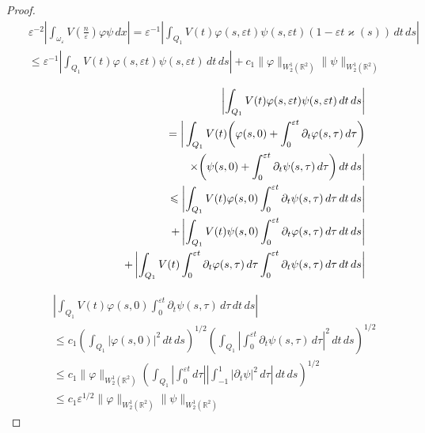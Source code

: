 \documentclass[graybox]{svmult}
\renewcommand{\kappa}{\varkappa}
\newcommand{\Real}{\mathbb R}
\newcommand{\eps}{\varepsilon}
\renewcommand{\phi}{\varphi}
\renewcommand{\leq}{\leqslant}
\newcommand\nep{\textstyle\frac n\eps}
\begin{document}
\begin{proof}
\begin{eqnarray}\nonumber
 &&\eps^{-2}\left|\int_{\omega_\eps}V(\nep)\phi \psi\,dx\right|=
  \eps^{-1}\left|\int_{Q_1}V(t)\phi(s,\eps t) \psi(s,\eps t)
(1-\eps t \kappa(s) )\,dt\,ds\right|\\\nonumber
&&\leq \eps^{-1}\left|\int_{Q_1}V(t)\phi(s,\eps t) \psi(s,\eps t)
\,dt\,ds\right|+c_1\|\phi\|_{W_2^1(\Real^2)}\|\psi\|_{W_2^1(\Real^2)}
\end{eqnarray}

\begin{eqnarray}\nonumber
&&\left|\int_{Q_1}V(t)\phi(s,\eps t) \psi(s,\eps t)
\,dt\,ds\right|\\\nonumber
&&= \bigg|\int_{Q_1}V(t)\bigg(\phi(s,0)
+\int_0^{\eps t}\partial_t\phi(s,\tau)\,d \tau\bigg)\\\nonumber
&&\kern120pt\times\bigg(\psi(s,0)+\int_0^{\eps t}\partial_t\psi(s,\tau)\,d \tau\bigg)\,dt\,ds\bigg|\\\nonumber
&&\leq  \left|\int_{Q_1}V(t)
\phi(s,0)\int_0^{\eps t}\partial_t\psi(s,\tau)\,d \tau\,dt\,ds\right|\\\nonumber
&&
+\left|\int_{Q_1}V(t)
\psi(s,0)\int_0^{\eps t}\partial_t\phi(s,\tau)\,d \tau\,dt\,ds\right|\\\nonumber
&&
+\left|\int_{Q_1}V(t)\int_0^{\eps t}\partial_t\phi(s,\tau)\,d \tau\int_0^{\eps t}\partial_t\psi(s,\tau)\,d \tau\,dt\,ds\right|
\end{eqnarray}



\begin{eqnarray}
 &&\left|\int_{Q_1}V(t)
\phi(s,0)\int_0^{\eps t}\partial_t\psi(s,\tau)\,d \tau\,dt\,ds\right|\\\nonumber
&&\leq c_1 \left(\int_{Q_1}|\phi(s,0)|^2\,dt\,ds\right)^{1/2}
\left(\int_{Q_1}\left|\int_0^{\eps t}\partial_t\psi(s,\tau)\,d \tau\right|^2\,dt\,ds\right)^{1/2}\\\nonumber
&&\leq c_1 \|\phi\|_{W_2^1(\Real^2)}
\left(\int_{Q_1}
\left|\int_0^{\eps t}d \tau\right|
\left|\int_{-1}^{1}|\partial_t\psi|^2\,d \tau\right|\,dt\,ds\right)^{1/2}\\\nonumber
&&\leq c_1\eps^{1/2} \|\phi\|_{W_2^1(\Real^2)}\|\psi\|_{W_2^1(\Real^2)}
\end{eqnarray}

\end{proof}












\newpage

\end{document}
